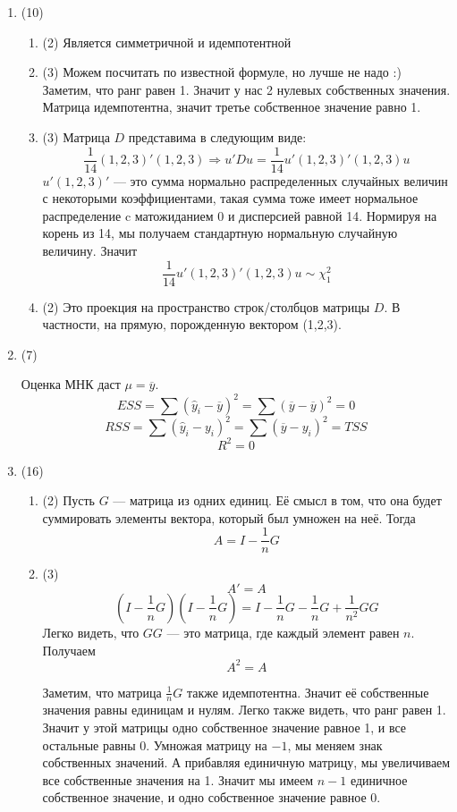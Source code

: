 \documentclass[12pt, a4paper]{article}
\begin{document}
\begin{enumerate}
\item (10)
\begin{enumerate}
  \item (2)
  Является симметричной и идемпотентной
  \item (3)
Можем посчитать по известной формуле, но лучше не надо :) Заметим, что ранг равен 1. Значит у нас 2 нулевых собственных значения. Матрица идемпотентна, значит третье собственное значение равно 1.
  \item (3)
Матрица $D$ представима в следующим виде:
\[
\frac{1}{14} (1, 2, 3)' (1,2,3) \Rightarrow u'Du = \frac{1}{14} u'(1, 2, 3)' (1,2,3)u
\]
$u'(1, 2,3)' $ — это сумма нормально распределенных случайных величин с некоторыми коэффициентами, такая сумма тоже имеет нормальное распределение c матожиданием 0 и дисперсией равной 14. Нормируя на корень из 14, мы получаем стандартную нормальную случайную величину. Значит
\[
\frac{1}{14} u'(1, 2, 3)' (1,2,3)u \sim \chi_1^2
\]

  \item (2)
Это проекция на пространство строк/столбцов матрицы $D$. В частности, на прямую, порожденную вектором (1,2,3).
\end{enumerate}

\item (7)

Оценка МНК даст $\mu = \overline{y}$.
\[
ESS = \sum (\hat{y}_i - \overline{y})^2 = \sum (\overline{y}- \overline{y})^2 = 0
\]
\[
RSS =  \sum (\hat{y}_i - y_i)^2 =  \sum (\overline{y} - y_i)^2  = TSS
\]
\[
R^2 = 0
\]

\item (16)
\begin{enumerate}
\item (2)
Пусть $G$ — матрица из одних единиц. Её смысл в том, что она будет суммировать элементы вектора, который был умножен на неё. Тогда
\[
A = I - \frac{1}{n}G
\]
\item (3)
\[
A' = A
\]
\[
(I - \frac{1}{n}G)(I - \frac{1}{n}G) = I -  \frac{1}{n}G - \frac{1}{n}G + \frac{1}{n^2}GG
\]
Легко видеть, что $GG$ — это матрица, где каждый элемент равен $n$. Получаем
\[
A^2 = A
\]

Заметим, что матрица $\frac{1}{n}G$ также идемпотентна. Значит её собственные значения равны единицам и нулям. Легко также видеть, что ранг равен 1. Значит у этой матрицы одно собственное значение равное 1, и все остальные равны 0. Умножая матрицу на $-1$, мы меняем знак собственных значений. А прибавляя единичную матрицу, мы увеличиваем все собственные значения на 1. Значит мы имеем $n-1$ единичное собственное значение, и одно собственное значение равное 0.


\end{enumerate}
\end{enumerate}
\end{document}
